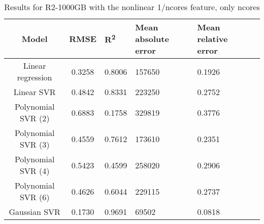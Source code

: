 \begin{table}[H]
\centering
\begin{adjustbox}{center}
\begin{tabular}{c | c M{1.2cm} M{2.5cm} M{2.5cm} M{1.8cm}}
Model & RMSE & R\textsuperscript{2} & Mean absolute error & Mean relative error \tabularnewline
\hline
Linear regression & 0.3258 & 0.8006 & 157650 & 0.1926 \\
Linear SVR & 0.4842 & 0.8331 & 223250 & 0.2752 \\
Polynomial SVR (2) & 0.6883 & 0.1758 & 329819 & 0.3776 \\
Polynomial SVR (3) & 0.4559 & 0.7612 & 173610 & 0.2351 \\
Polynomial SVR (4) & 0.5423 & 0.4599 & 258020 & 0.2906 \\
Polynomial SVR (6) & 0.4626 & 0.6044 & 229115 & 0.2737 \\
Gaussian SVR & 0.1730 & 0.9691 &  69502 & 0.0818 \\
\end{tabular}
\end{adjustbox}
\\
\caption{Results for R2-1000GB with the nonlinear 1/ncores feature, only ncores}
\label{tab:all_nonlinear_R2_1000}
\end{table}
